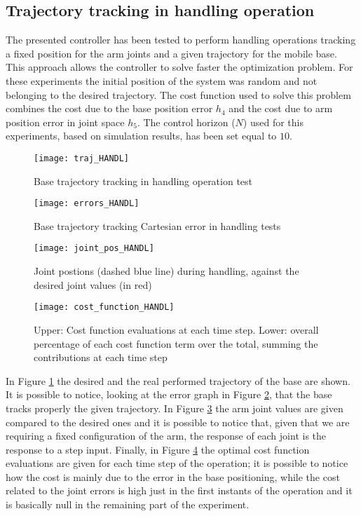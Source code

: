 \subsection{Trajectory tracking in handling operation}
The presented controller has been tested to perform handling operations tracking a fixed position for the arm joints and a given trajectory for the mobile base. This approach allows the controller to solve faster the optimization problem. For these experiments the initial position of the system was random and not belonging to the desired trajectory. The cost function used to solve this problem combines the cost due to the base position error $h_4$ and the cost due to arm position error in joint space $h_5$. The control horizon ($N$) used for this experiments, based on simulation results, has been set equal to $10$. 
\begin{figure}[h!]
\centering
\texttt{[image: traj\_HANDL]}
\caption{Base trajectory tracking in handling operation test}
\label{traj_handl}
\end{figure}
\begin{figure}[h!]
\centering
\texttt{[image: errors\_HANDL]}
\caption{Base trajectory tracking Cartesian error in handling tests}
\label{err_handl}
\end{figure}

\begin{figure}[h!]
\centering
\texttt{[image: joint\_pos\_HANDL]}
\caption{Joint postions (dashed blue line) during handling, against the desired joint values (in red)}
\label{joint_pos_handl}
\end{figure}  

\begin{figure}[h!]
\centering
\texttt{[image: cost\_function\_HANDL]}
\caption{Upper: Cost function evaluations at each time step. Lower: overall percentage of each cost function term over the total, summing the contributions at each time step}
\label{cost_function_HANDL}
\end{figure}

In Figure \ref{traj_handl} the desired and the real performed trajectory of the base are shown. It is possible to notice, looking at the error graph in Figure \ref{err_handl}, that the base tracks properly the given trajectory. In Figure \ref{joint_pos_handl} the arm joint values are given compared to the desired ones and it is possible to notice that, given that we are requiring a fixed configuration of the arm, the response of each joint is the response to a step input. Finally, in Figure \ref{cost_function_HANDL} the optimal cost function evaluations are given for each time step of the operation; it is possible to notice how the cost is mainly due to the error in the base positioning, while the cost related to the joint errors is high just in the first instants of the operation and it is basically null in the remaining part of the experiment.

